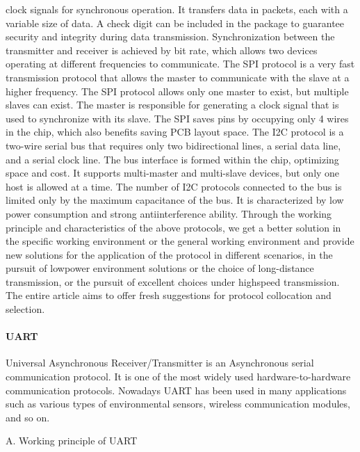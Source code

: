 \documentclass[12pt,a4paper]{article}
\numberwithin{equation}{section}
\begin{document}
clock signals for synchronous operation. It transfers data in packets,
each with a variable size of data. A check digit can be included in the
package to guarantee security and integrity during data transmission.
Synchronization between the transmitter and receiver is achieved by bit
rate, which allows two devices operating at different frequencies to
communicate. The SPI protocol is a very fast transmission protocol that
allows the master to communicate with the slave at a higher frequency.
The SPI protocol allows only one master to exist, but multiple slaves
can exist. The master is responsible for generating a clock signal that
is used to synchronize with its slave. The SPI saves pins by occupying
only 4 wires in the chip, which also benefits saving PCB layout space.
The I2C protocol is a two-wire serial bus that requires only two
bidirectional lines, a serial data line, and a serial clock line. The
bus interface is formed within the chip, optimizing space and cost. It
supports multi-master and multi-slave devices, but only one host is
allowed at a time. The number of I2C protocols connected to the bus is
limited only by the maximum capacitance of the bus. It is characterized
by low power consumption and strong antiinterference ability. Through
the working principle and characteristics of the above protocols, we get
a better solution in the specific working environment or the general
working environment and provide new solutions for the application of the
protocol in different scenarios, in the pursuit of lowpower environment
solutions or the choice of long-distance transmission, or the pursuit of
excellent choices under highspeed transmission. The entire article aims
to offer fresh suggestions for protocol collocation and selection.

\paragraph{UART}

Universal Asynchronous Receiver/Transmitter is an Asynchronous serial
communication protocol. It is one of the most widely used
hardware-to-hardware communication protocols. Nowadays UART has been
used in many applications such as various types of environmental
sensors, wireless communication modules, and so on.

A.  Working principle of UART
\end{document}
